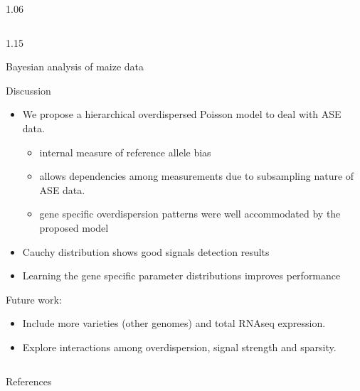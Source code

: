 \documentclass[final]{beamer}
\newlength{\onecolwid}
\newlength{\twocolwid}
\newlength{\threecolwid}
\begin{document}
\begin{frame}
\begin{columns}[t,totalwidth=\threecolwid]
\begin{column}{1.06\twocolwid}
\begin{columns}[t, totalwidth = 1.06\twocolwid]
\begin{column}{1.15\onecolwid}
\begin{alertblock}{Bayesian analysis of maize data}
\end{alertblock}

\begin{alertblock}{Discussion}
\begin{itemize}

\item We propose a hierarchical overdispersed Poisson model to deal with ASE data. 
    \begin{itemize} 
        \item internal measure of reference allele bias 
        \item allows dependencies among measurements due to subsampling nature of ASE data.
        \item gene specific overdispersion patterns were well accommodated by the proposed model
    \end{itemize}
\item Cauchy distribution shows good signals detection results
\item Learning the gene specific parameter distributions improves performance
\end{itemize}

\vspace{.5cm}

Future work: 
\begin{itemize}
\item Include more varieties (other genomes) and total RNAseq expression.  
\item Explore interactions among overdispersion, signal strength and sparsity. 
\end{itemize}
\end{alertblock}

\end{column}
\end{columns}

\end{column}
\end{columns}


\end{frame}


\begin{frame}
\begin{alertblock}{References}
        
\small{   }
\end{alertblock}
\end{frame}
\end{document}
